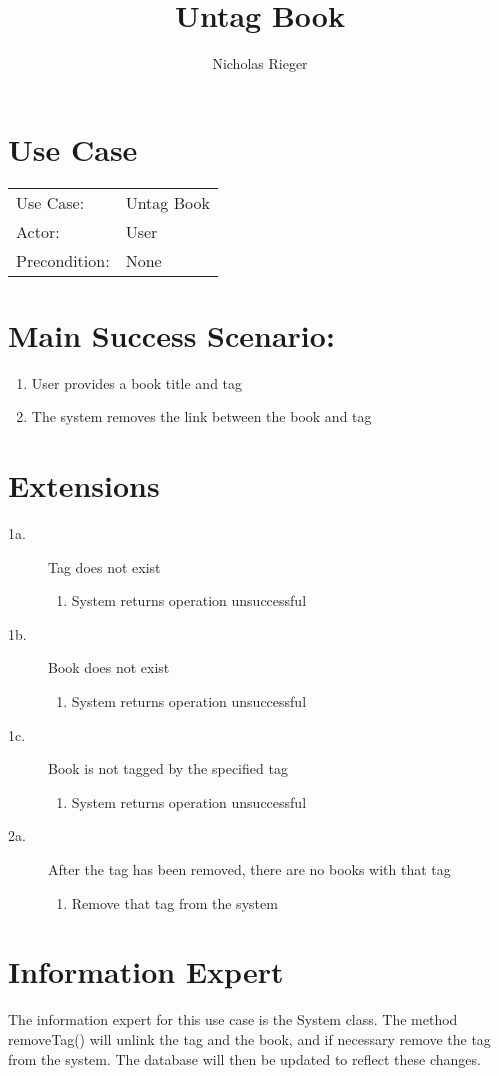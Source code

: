 \documentclass{article}
\title{Untag Book}
\author{Nicholas Rieger}
\begin{document}
\maketitle

\section*{Use Case}
\begin{tabular}{l l}
  Use Case:     & Untag Book \\
  Actor:        & User       \\
  Precondition: & None       \\
\end{tabular}

\section*{Main Success Scenario:}
\begin{enumerate}
    \item User provides a book title and tag
    \item The system removes the link between the book and tag
\end{enumerate}

\section*{Extensions}
\begin{description}
    \item[1a.] Tag does not exist
    \begin{enumerate}
        \item System returns operation unsuccessful
    \end{enumerate}
    \item[1b.] Book does not exist
    \begin{enumerate}
        \item System returns operation unsuccessful
    \end{enumerate}
    \item[1c.] Book is not tagged by the specified tag
    \begin{enumerate}
        \item System returns operation unsuccessful
    \end{enumerate}
    \item[2a.] After the tag has been removed, there are no books with that tag
    \begin{enumerate}
        \item Remove that tag from the system
    \end{enumerate}
\end{description}

\section*{Information Expert}
The information expert for this use case is the System class.
The method removeTag() will unlink the tag and the book, and if
necessary remove the tag from the system. The database will then
be updated to reflect these changes.
\end{document}
